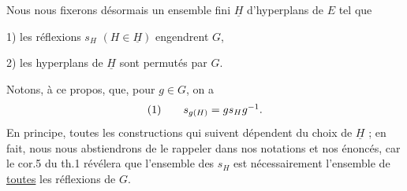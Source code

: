 Nous nous fixerons désormais un ensemble fini $\underline{H}$ d'hyperplans de $E$ tel que

1) les réflexions $s_H$ $(H\in\underline{H})$ engendrent $G$,

2) les hyperplans de $\underline{H}$ sont permutés par $G$.

Notons, à ce propos, que, pour $g\in G$, on a
\[
\begin{array}{l@{\qquad}l}(1)&s_{g(H)}=gs_Hg^{-1}.\end{array}
\]
En principe, toutes les constructions qui suivent dépendent du choix de $\underline{H}$ ; en fait, nous nous abstiendrons de le rappeler dans nos notations et nos énoncés, car le cor.5 du th.1 révélera que l'ensemble des $s_H$ est nécessairement l'ensemble de \uline{toutes} les réflexions de $G$.
